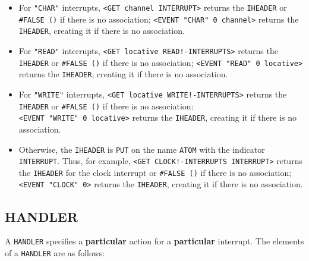 \documentclass[a4paper]{scrbook}
\providecommand{\tightlist}{%
  \setlength{\itemsep}{0pt}\setlength{\parskip}{0pt}}
\begin{document}
\begin{itemize}
\tightlist
\item
  For \texttt{"CHAR"} interrupts,
  \texttt{\textless{}GET\ channel\ INTERRUPT\textgreater{}} returns the \texttt{IHEADER}
  or \texttt{\#FALSE\ ()} if there is no association;
  \texttt{\textless{}EVENT\ "CHAR"\ 0\ channel\textgreater{}} returns the \texttt{IHEADER}, creating
  it if there is no association.
\item
  For \texttt{"READ"} interrupts, \texttt{\textless{}GET\ locative\ READ!-INTERRUPTS\textgreater{}} returns the
  \texttt{IHEADER} or \texttt{\#FALSE\ ()} if there is no association;
  \texttt{\textless{}EVENT\ "READ"\ 0\ locative\textgreater{}} returns the \texttt{IHEADER}, creating it if there is no
  association.
\item
  For \texttt{"WRITE"} interrupts, \texttt{\textless{}GET\ locative\ WRITE!-INTERRUPTS\textgreater{}} returns the
  \texttt{IHEADER} or \texttt{\#FALSE\ ()} if there is no association:
  \texttt{\textless{}EVENT\ "WRITE"\ 0\ locative\textgreater{}} returns the \texttt{IHEADER}, creating it if there is no
  association.
\item
  Otherwise, the \texttt{IHEADER} is \texttt{PUT} on the name \texttt{ATOM} with the indicator \texttt{INTERRUPT}. Thus,
  for example, \texttt{\textless{}GET\ CLOCK!-INTERRUPTS\ INTERRUPT\textgreater{}} returns the \texttt{IHEADER} for the
  clock interrupt or \texttt{\#FALSE\ ()} if there is no association; \texttt{\textless{}EVENT\ "CLOCK"\ 0\textgreater{}}
  returns the \texttt{IHEADER}, creating it if there is no association.
\end{itemize}

\subsection{HANDLER}\label{handler}

A \texttt{HANDLER} specifies a \textbf{particular} action for a \textbf{particular} interrupt. The elements of a
\texttt{HANDLER} are as follows:
\end{document}
